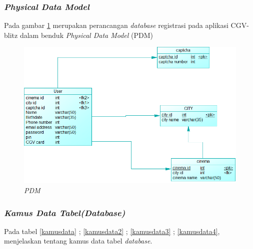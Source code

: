 \subsubsection{\textit{Physical Data Model}}
\par
Pada gambar \ref{pdm} merupakan perancangan \textit{database} registrasi pada aplikasi CGV-blitz dalam benduk \textit{Physical Data Model} (PDM)


\begin{figure}[!htbp]
    \centering
    \includegraphics[scale=0.6]{gambar/PDM}
    \caption{\textit{PDM}}
    \label{pdm}
\end{figure}

\subsubsection{\textit{Kamus Data Tabel(Database)}}
\par
Pada tabel \ref{kamusdata} ; \ref{kamusdata2} ; \ref{kamusdata3} ; \ref{kamusdata4}, menjelaskan tentang kamus data tabel \textit{database}.


